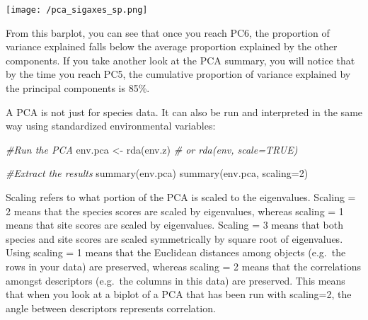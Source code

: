 \documentclass[
]{book}
\newenvironment{Shaded}{\begin{snugshade}}{\end{snugshade}}
\newcommand{\AttributeTok}[1]{\textcolor[rgb]{0.77,0.63,0.00}{#1}}
\newcommand{\CommentTok}[1]{\textcolor[rgb]{0.56,0.35,0.01}{\textit{#1}}}
\newcommand{\DecValTok}[1]{\textcolor[rgb]{0.00,0.00,0.81}{#1}}
\newcommand{\FunctionTok}[1]{\textcolor[rgb]{0.00,0.00,0.00}{#1}}
\newcommand{\NormalTok}[1]{#1}
\newcommand{\OtherTok}[1]{\textcolor[rgb]{0.56,0.35,0.01}{#1}}
\newcommand{\SpecialCharTok}[1]{\textcolor[rgb]{0.00,0.00,0.00}{#1}}
\newcommand{\StringTok}[1]{\textcolor[rgb]{0.31,0.60,0.02}{#1}}
\begin{document}
\begin{Shaded}
\end{Shaded}

\texttt{[image: /pca\_sigaxes\_sp.png]}

From this barplot, you can see that once you reach PC6, the proportion
of variance explained falls below the average proportion explained by
the other components. If you take another look at the PCA summary, you
will notice that by the time you reach PC5, the cumulative proportion of
variance explained by the principal components is 85\%.

A PCA is not just for species data. It can also be run and interpreted
in the same way using standardized environmental variables:

\begin{Shaded}
\begin{Highlighting}[]
\CommentTok{\#Run the PCA}
\NormalTok{env.pca }\OtherTok{\textless{}{-}} \FunctionTok{rda}\NormalTok{(env.z) }\CommentTok{\# or rda(env, scale=TRUE)}

\CommentTok{\#Extract the results}
\FunctionTok{summary}\NormalTok{(env.pca)}
\FunctionTok{summary}\NormalTok{(env.pca, }\AttributeTok{scaling=}\DecValTok{2}\NormalTok{) }
\end{Highlighting}
\end{Shaded}

Scaling refers to what portion of the PCA is scaled to the eigenvalues.
Scaling = 2 means that the species scores are scaled by eigenvalues,
whereas scaling = 1 means that site scores are scaled by eigenvalues.
Scaling = 3 means that both species and site scores are scaled
symmetrically by square root of eigenvalues. Using scaling = 1 means
that the Euclidean distances among objects (e.g.~the rows in your data)
are preserved, whereas scaling = 2 means that the correlations amongst
descriptors (e.g.~the columns in this data) are preserved. This means
that when you look at a biplot of a PCA that has been run with
scaling=2, the angle between descriptors represents correlation.
\end{document}

